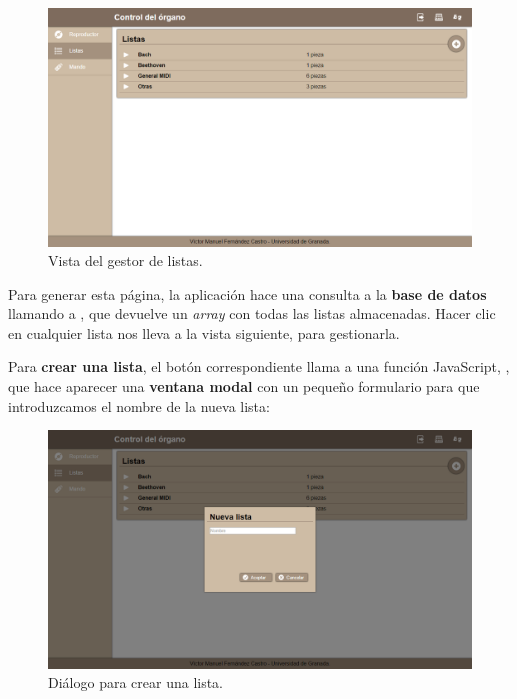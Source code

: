 \begin{figure}[H]
	\noindent \begin{centering}
		\includegraphics[width=\linewidth*3/4]{capitulo5/cap_listas}
		\par\end{centering}
	\smallskip
	\caption{\label{fig:cap_listas} Vista del gestor de listas.}
\end{figure} 

\smallskip

Para generar esta página, la aplicación hace una consulta a la \textbf{base de datos} llamando a , que devuelve un \textit{array} con todas las listas almacenadas. Hacer clic en cualquier lista nos lleva a la vista siguiente, para gestionarla.

Para \textbf{crear una lista}, el botón correspondiente llama a una función JavaScript, , que hace aparecer una \textbf{ventana modal} con un pequeño formulario para que introduzcamos el nombre de la nueva lista:

\smallskip

\begin{figure}[H]
	\noindent \begin{centering}
		\includegraphics[width=\linewidth*3/4]{capitulo5/cap_ins_lista}
		\par\end{centering}
	\smallskip
	\caption{\label{fig:cap_ins_lista} Diálogo para crear una lista.}
\end{figure} 

